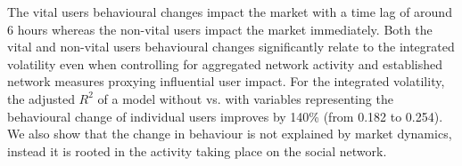 

 The vital users behavioural changes impact the market with a time lag of around 6 hours whereas the non-vital users impact the market immediately. Both the vital and non-vital users behavioural changes significantly relate to the integrated volatility even when controlling for aggregated network activity and established network measures proxying influential user impact. For the integrated volatility, the adjusted $R^2$ of a model without vs. with variables representing the behavioural change of individual users improves by 140\% (from 0.182 to 0.254). We also show that the change in behaviour is not explained by market dynamics, instead it is rooted in the activity taking place on the social network. 


